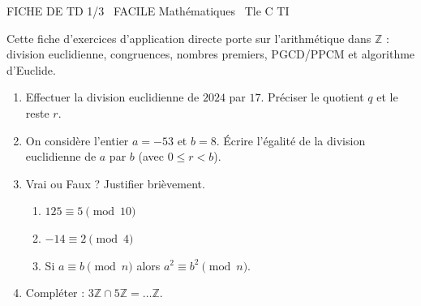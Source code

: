 \documentclass[11pt]{article}
\begin{document}
\begin{tcolorbox}[enhanced,colback=popink,colframe=popink,arc=10pt,boxrule=0pt,left=12pt,right=12pt,top=9pt,bottom=9pt]
{\color{white}\popxbold\small FICHE DE TD 1/3 \textbullet\ FACILE \hfill Mathématiques \textbullet\ Tle C TI\par}
\end{tcolorbox}
\vspace{4pt}
\noindent Cette fiche d'exercices d'application directe porte sur l'arithmétique dans $\mathbb{Z}$ : division euclidienne, congruences, nombres premiers, PGCD/PPCM et algorithme d'Euclide.

\begin{exercice}
\begin{enumerate}
    \item Effectuer la division euclidienne de $2024$ par $17$. Préciser le quotient $q$ et le reste $r$.
    \item On considère l'entier $a = -53$ et $b = 8$. Écrire l'égalité de la division euclidienne de $a$ par $b$ (avec $0 \le r < b$).
    \item Vrai ou Faux ? Justifier brièvement.
    \begin{enumerate}
        \item $125 \equiv 5 \pmod{10}$
        \item $-14 \equiv 2 \pmod{4}$
        \item Si $a \equiv b \pmod{n}$ alors $a^2 \equiv b^2 \pmod{n}$.
    \end{enumerate}
    \item Compléter : $3\mathbb{Z} \cap 5\mathbb{Z} = \dots \mathbb{Z}$.
\end{enumerate}
\end{exercice}
\end{document}
